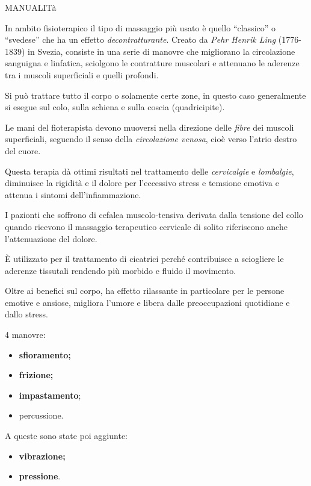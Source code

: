 \documentclass[]{article}
\begin{document}
MANUALITà

In ambito fisioterapico il tipo di massaggio più usato è quello
``classico'' o ``svedese'' che ha un effetto \emph{decontratturante}.
Creato da \emph{Pehr Henrik Ling} (1776-1839) in Svezia, consiste in una
serie di manovre che migliorano la circolazione sanguigna e linfatica,
sciolgono le contratture muscolari e attenuano le aderenze tra i muscoli
superficiali e quelli profondi.

Si può trattare tutto il corpo o solamente certe zone, in questo caso
generalmente si esegue sul colo, sulla schiena e sulla coscia
(quadricipite).

Le mani del fioterapista devono muoversi nella direzione delle
\emph{fibre} dei muscoli superficiali, seguendo il senso della
\emph{circolazione venosa}, cioè verso l'atrio destro del cuore.

Questa terapia dà ottimi risultati nel trattamento delle
\emph{cervicalgie} e \emph{lombalgie}, diminuisce la rigidità e il
dolore per l'eccessivo stress e temsione emotiva e attenua i sintomi
dell'infiammazione.

I pazionti che soffrono di cefalea muscolo-tensiva derivata dalla
tensione del collo quando ricevono il massaggio terapeutico cervicale di
solito riferiscono anche l'attenuazione del dolore.

È utilizzato per il trattamento di cicatrici perché contribuisce a
sciogliere le aderenze tissutali rendendo più morbido e fluido il
movimento.

Oltre ai benefici sul corpo, ha effetto rilassante in particolare per le
persone emotive e ansiose, migliora l'umore e libera dalle
preoccupazioni quotidiane e dallo stress.

4 manovre:

\begin{itemize}
\item
  \textbf{sfioramento;}
\item
  \textbf{frizione;}
\item
  \textbf{impastamento};
\item
  percussione.
\end{itemize}

A queste sono state poi aggiunte:

\begin{itemize}
\item
  \textbf{vibrazione;}
\item
  \textbf{pressione}.
\end{itemize}
\end{document}
